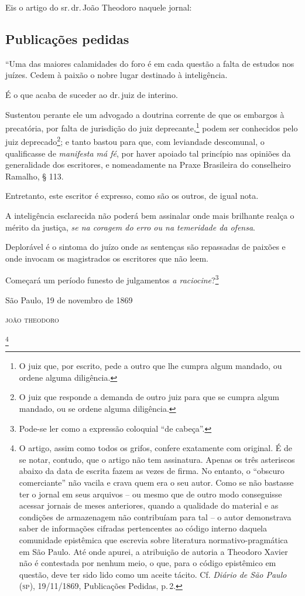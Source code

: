 Eis o artigo do sr.\,dr.\,João Theodoro naquele jornal:

\subsection{Publicações pedidas}

``Uma das maiores calamidades do foro é em cada questão a falta de
estudos nos juízes. Cedem à paixão o nobre lugar destinado à
inteligência.

É o que acaba de suceder ao dr.\,juiz de interino.

Sustentou perante ele um advogado a doutrina corrente de que os embargos
à precatória, por falta de jurisdição do juiz deprecante,\footnote{ O
  juiz que, por escrito, pede a outro que lhe cumpra algum mandado, ou
  ordene alguma diligência.} podem ser conhecidos pelo juiz
deprecado\footnote{ O juiz que responde a demanda de outro juiz para
  que se cumpra algum mandado, ou se ordene alguma diligência.}; e tanto
bastou para que, com leviandade descomunal, o qualificasse de
\emph{manifesta má fé}, por haver apoiado tal princípio nas opiniões da
generalidade dos escritores, e nomeadamente na Praxe Brasileira do
conselheiro Ramalho, § 113.

Entretanto, este escritor é expresso, como são os outros, de igual nota.

A inteligência esclarecida não poderá bem assinalar onde mais brilhante
realça o mérito da justiça, \emph{se na coragem do erro ou na temeridade
da ofensa}.

Deplorável é o sintoma do juízo onde as sentenças são repassadas de
paixões e onde invocam os magistrados os escritores que não leem.

Começará um período funesto de julgamentos \emph{a
raciocine}?\footnote{ Pode-se ler como a expressão coloquial ``de
  cabeça''.}

\begin{flushright}
São Paulo, 19 de novembro de 1869

\textsc{joão theodoro}
\end{flushright}

\asterisc{}\footnote{ O artigo, assim como todos os grifos, confere exatamente
  com original. É de se notar, contudo, que o artigo não tem assinatura.
  Apenas os três asteriscos abaixo da data de escrita fazem as vezes de
  firma. No entanto, o ``obscuro comerciante'' não vacila e crava quem era
  o seu autor. Como se não bastasse ter o jornal em seus arquivos -- ou
  mesmo que de outro modo conseguisse acessar jornais de meses
  anteriores, quando a qualidade do material e as condições de
  armazenagem não contribuíam para tal -- o autor demonstrava saber de
  informações cifradas pertencentes ao código interno daquela comunidade
  epistêmica que escrevia sobre literatura normativo-pragmática em São
  Paulo. Até onde apurei, a atribuição de autoria a Theodoro Xavier não
  é contestada por nenhum meio, o que, para o código epistêmico em
  questão, deve ter sido lido como um aceite tácito. Cf. \emph{Diário de
  São Paulo} (\textsc{sp}), 19/11/1869, Publicações Pedidas, p.\,2.}

